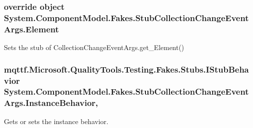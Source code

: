 \hypertarget{class_system_1_1_component_model_1_1_fakes_1_1_stub_collection_change_event_args_a60ca00fc79124ea2510be7ab3d0dbf7a}{
\subsubsection[{Element}]{\setlength{\rightskip}{0pt plus 5cm}override object System.\-Component\-Model.\-Fakes.\-Stub\-Collection\-Change\-Event\-Args.\-Element\hspace{0.3cm}{\ttfamily [get]}}}\label{class_system_1_1_component_model_1_1_fakes_1_1_stub_collection_change_event_args_a60ca00fc79124ea2510be7ab3d0dbf7a}


Sets the stub of Collection\-Change\-Event\-Args.\-get\-\_\-\-Element()

\hypertarget{class_system_1_1_component_model_1_1_fakes_1_1_stub_collection_change_event_args_ad077c6214d8f144cea7e3cfffd4c8074}{
\subsubsection[{Instance\-Behavior}]{\setlength{\rightskip}{0pt plus 5cm}mqttf.\-Microsoft.\-Quality\-Tools.\-Testing.\-Fakes.\-Stubs.\-I\-Stub\-Behavior System.\-Component\-Model.\-Fakes.\-Stub\-Collection\-Change\-Event\-Args.\-Instance\-Behavior\hspace{0.3cm}{\ttfamily [get]}, {\ttfamily [set]}}}\label{class_system_1_1_component_model_1_1_fakes_1_1_stub_collection_change_event_args_ad077c6214d8f144cea7e3cfffd4c8074}


Gets or sets the instance behavior.

